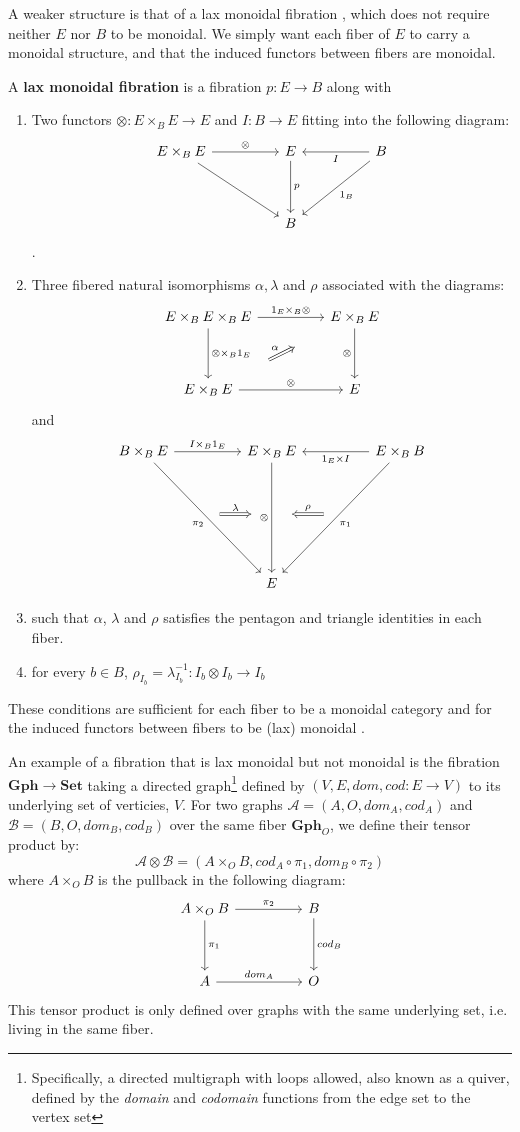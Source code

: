 A weaker structure is that of a lax monoidal fibration \cite{zawadowski}, which does not require neither $E$ nor $B$ to be monoidal. We simply want each fiber of $E$ to carry a monoidal structure, and that the induced functors between fibers are monoidal.
\begin{defn}
A \textbf{lax monoidal fibration} is a fibration $p : E \to B$ along with
\begin{enumerate}
\item Two functors $\otimes : E \times_{B} E \to E$ and $I : B \to E$ fitting into the following diagram:
\[
\ti
E \times_{B} E \ar[r, "\otimes"] \ar[rd] & E \ar[d, "p"] & B \ar[l, "I"] \ar[ld, "1_B"] \\
& B &
\kz
\].
\item Three fibered natural isomorphisms $\alpha, \lambda$ and $\rho$ associated with the diagrams:
\[
\ti
E \times_B E \times_B E \ar[r, "1_E \times_B \otimes"] \ar[d, "\otimes \times_B 1_E"] & E \times_B E \ar[d, "\otimes", swap] \\
E \times_B E \ar[r, "\otimes"] \ar[ru, "\alpha", Rightarrow, shorten <=30pt,shorten >=30pt]  & E
\kz
\]
and
\[
\ti
B \times_B E \ar[r, "I \times_B 1_{E}"] \ar[rdd, "\pi_2",swap] & E \times_B E  \ar[dd, "\otimes",swap] & E \times_B B \ar[ldd, "\pi_1"] \ar[l, "1_E \times I"] \\
\ar[r, "\lambda", xshift=20 pt, Rightarrow, shorten <=30pt, shorten >=30pt] & {}& \ar[l, "\rho", Rightarrow, xshift=-20pt, shorten <=30pt, shorten >=30pt,swap] \\
  & E &  
\kz
\]
\item such that $\alpha$, $\lambda$ and $\rho$ satisfies the pentagon and triangle identities in each fiber.
\item for every $b \in B$, $\rho_{I_b} = \lambda^{-1}_{I_b} : I_b \otimes I_b \to I_b$
\end{enumerate}
\end{defn}
These conditions are sufficient for each fiber to be a monoidal category and for the induced functors between fibers to be (lax) monoidal \cite{zawadowski}.\\
\begin{expl}\label{graphs}
An example of a fibration that is lax monoidal but not monoidal is the fibration $\mathbf{Gph} \to \mathbf{Set}$ taking a directed graph\footnote{Specifically, a directed multigraph with loops allowed, also known as a quiver, defined by the \textit{domain} and \textit{codomain} functions from the edge set to the vertex set} defined by $(V, E, dom, cod : E \to V)$ to its underlying set of verticies, $V$. For two graphs $\mathcal{A}= (A, O, dom_A, cod_A)$ and $\mathcal{B} = (B, O, dom_B, cod_B)$ over the same fiber $\mathbf{Gph}_O$, we define their tensor product by:
\[
  \mathcal{A} \otimes \mathcal{B} = (A \times_O B, cod_A \circ \pi_1, dom_B \circ \pi_2)
\]
where $A \times_O B$ is the pullback in the following diagram:
\[
  \ti
  A \times_O B \ar[r, "\pi_2"] \ar[d, "\pi_1"] & B \ar[d, "cod_B"]\\
  A \ar[r, "dom_A"] & O
  \kz
\]
This tensor product is only defined over graphs with the same underlying set, i.e. living in the same fiber.
\end{expl}